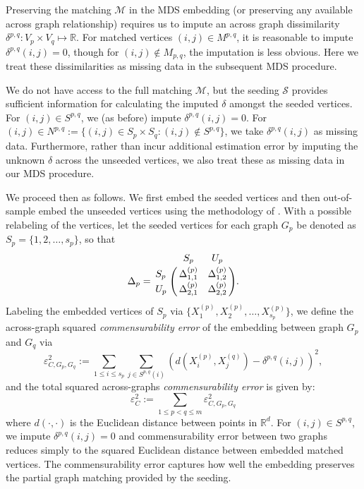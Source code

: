 \documentclass[12pt]{article}
\numberwithin{equation}{section}
\theoremstyle{definition}
\newcommand{\gD}{{\Delta}}
\begin{document}
Preserving the matching $\mathcal{M}$ in the MDS embedding (or
preserving any available across graph relationship) requires us to
impute an across graph dissimilarity $\delta^{p,q}:V_p\times V_q\mapsto
\mathbb{R}$.  For matched vertices $(i,j)\in M^{p,q}$, it is reasonable
to impute $\delta^{p,q}(i,j)=0$, though for $(i,j)\notin M_{p,q}$, the
imputation is less obvious.
Here we treat these dissimilarities as missing data in the subsequent
MDS procedure.


We do not have access to the full matching $\mathcal{M}$, but the seeding $\mathcal{S}$ provides sufficient information for calculating the imputed $\delta$ amongst the seeded vertices.  For $(i,j)\in S^{p,q}$, we (as before) impute $\delta^{p,q}(i,j)=0$.
For $(i,j)\in {N^{p,q}} :=\{(i,j)\in S_p\times S_q: (i,j)\notin S^{p,q}\}$, we take $\delta^{p,q}(i,j)$ as missing data. Furthermore, rather than incur additional estimation error by imputing the unknown $\delta$ across the unseeded vertices, we also treat these as missing data in our MDS procedure.


We proceed then as follows.  We first embed the seeded vertices and then out-of-sample embed the unseeded vertices using the methodology of \cite{oos}.  With a possible relabeling of the vertices, let the seeded vertices for each graph $G_p$ be denoted as $S_p=\{1,2,\ldots,s_p\}$, so that
$$\Delta_p=\bordermatrix{&S_p&U_p\cr
                S_p&\gD^{(p)}_{1,1} & \gD^{(p)}_{1,2}  \cr
                U_p& \gD^{(p)}_{2,1}  &  \gD^{(p)}_{2,2}}.%
                $$
Labeling the embedded vertices of $S_p$ via $\{X^{(p)}_1,X^{(p)}_2,\ldots,X^{(p)}_{s_p}\}$, we define the across-graph squared {\it commensurability error} of the embedding between graph $G_p$ and $G_q$ via
\begin{equation}
\label{eq:comm_pair}
\varepsilon^2_{C, G_p, G_q}:=\sum_{1\leq i\leq s_{p} } \sum_{j\in S^{p,q}(i)} \left(d(X^{(p)}_i,X^{(q)}_j)-\delta^{p,q}(i,j)\right)^2,
\end{equation}
and the total squared across-graphs {\it commensurability error} is given by:
\begin{equation}
\label{eq:comm}
\varepsilon^2_{C}:= \sum\limits_{1 \leq p < q \leq m} \varepsilon^2_{C, G_p, G_q}
\end{equation}
where
$d(\cdot,\cdot)$ is the Euclidean distance between points in $\mathbb{R}^d$.  For $(i,j)\in S^{p,q}$, we impute $\delta^{p,q}(i,j)=0$ and commensurability error between two graphs reduces simply to the squared Euclidean distance between embedded matched vertices.  The commensurability error captures how well the embedding preserves the partial graph matching provided by the seeding.
\end{document}
